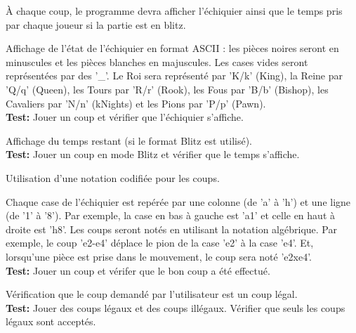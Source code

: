 \documentclass{article}
\begin{document}
\begin{needbox}
    À chaque coup, le programme devra afficher l'échiquier ainsi que le temps pris par chaque joueur si la partie est en blitz.
    \begin{subneedbox}[F26.1: Echiquier]
        Affichage de l'état de l'échiquier en format ASCII : les pièces noires seront en minuscules et les pièces blanches en majuscules. Les cases vides seront représentées par des '\_'. Le Roi sera représenté par 'K/k' (King), la Reine par 'Q/q' (Queen), les Tours par 'R/r' (Rook), les Fous par 'B/b' (Bishop), les Cavaliers par 'N/n' (kNights) et les Pions par 'P/p' (Pawn).\\
        \textbf{Test:} Jouer un coup et vérifier que l'échiquier s'affiche.
    \end{subneedbox}
    \begin{subneedbox}
        Affichage du temps restant (si le format Blitz est utilisé).\\
        \textbf{Test:} Jouer un coup en mode Blitz et vérifier que le temps s'affiche.
    \end{subneedbox}
\end{needbox}

\begin{needbox}
    Utilisation d'une notation codifiée pour les coups.
    \begin{subneedbox}
        Chaque case de l'échiquier est repérée par une colonne (de 'a' à 'h') et une ligne (de '1' à '8'). Par exemple, la case en bas à gauche est 'a1' et celle en haut à droite est 'h8'. Les coups seront notés en utilisant la notation algébrique. Par exemple, le coup 'e2-e4' déplace le pion de la case 'e2' à la case 'e4'. Et, lorsqu'une pièce est prise dans le mouvement, le coup sera noté 'e2xe4'.\\
        \textbf{Test:} Jouer un coup et vérifer que le bon coup a été effectué.
    \end{subneedbox}
    \begin{subneedbox}
        Vérification que le coup demandé par l'utilisateur est un coup légal.\\
        \textbf{Test:} Jouer des coups légaux et des coups illégaux. Vérifier que seuls les coups légaux sont acceptés.
    \end{subneedbox}
\end{needbox}
\end{document}
